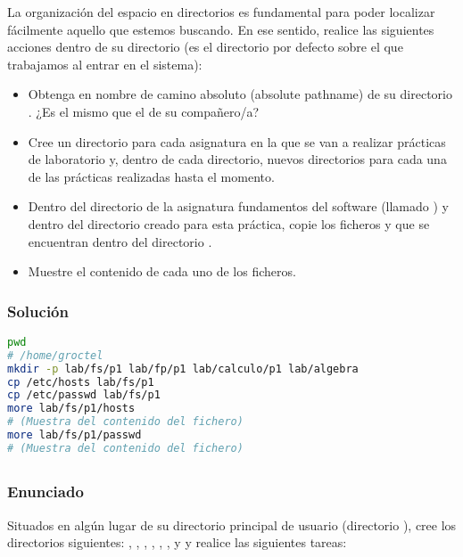 La organización del espacio en directorios es fundamental para poder localizar fácilmente aquello que estemos buscando.
En ese sentido, realice las siguientes acciones dentro de su directorio  (es el directorio por defecto sobre el que trabajamos al entrar en el sistema):

\begin{itemize}
	\item Obtenga en nombre de camino absoluto (absolute pathname) de su directorio . ¿Es el mismo que el de su compañero/a?
	\item Cree un directorio para cada asignatura en la que se van a realizar prácticas de laboratorio y, dentro de cada directorio, nuevos directorios para cada una de las prácticas realizadas hasta el momento.
	\item Dentro del directorio de la asignatura fundamentos del software (llamado ) y dentro del directorio creado para esta práctica, copie los ficheros  y  que se encuentran dentro del directorio .
	\item Muestre el contenido de cada uno de los ficheros.
\end{itemize}

\subsubsection{Solución}

\begin{lstlisting}[language=sh]
pwd
# /home/groctel
mkdir -p lab/fs/p1 lab/fp/p1 lab/calculo/p1 lab/algebra
cp /etc/hosts lab/fs/p1
cp /etc/passwd lab/fs/p1
more lab/fs/p1/hosts
# (Muestra del contenido del fichero)
more lab/fs/p1/passwd
# (Muestra del contenido del fichero)
\end{lstlisting}

\subsection{}\label{ej1-6}

\subsubsection{Enunciado}

Situados en algún lugar de su directorio principal de usuario (directorio ), cree los directorios siguientes: , , , , , ,  y  y realice las siguientes tareas:

